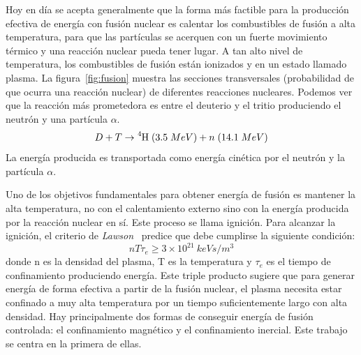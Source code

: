 Hoy en día se acepta generalmente que la forma más factible para la producción efectiva de energía 
con fusión nuclear es calentar los combustibles de fusión a alta temperatura, para que las partículas se acerquen
con un fuerte movimiento térmico y una reacción nuclear pueda tener lugar. A tan alto nivel de
temperatura, los combustibles de fusión están ionizados y en un estado llamado plasma. La figura~\ref{fig:fusion} muestra las
secciones transversales (probabilidad de que ocurra una reacción nuclear) de diferentes reacciones nucleares.
Podemos ver que la reacción más prometedora es entre el deuterio y el tritio produciendo el neutrón
y una partícula $\alpha$.
\begin{equation}\label{eq:deutreaction}
    D+T\rightarrow\ce{^{4}H}\;(3.5\;MeV)+n\;(14.1\;MeV)
\end{equation}
La energía producida es transportada como energía cinética por el neutrón y la partícula $\alpha$.\par
Uno de los objetivos fundamentales para obtener energía de fusión es mantener la alta temperatura, no con el calentamiento 
externo sino con la energía producida por la reacción nuclear en sí. Este
proceso se llama ignición. Para alcanzar la ignición, el criterio de \textit{Lawson}~\cite{Lawson_1957} predice que 
debe cumplirse la siguiente condición:
\begin{equation}\label{eq:lawson}
    nT\tau_e\geq3\times10^{21}\:keVs/m^{3}
\end{equation}
donde n es la densidad del plasma, T es la temperatura y $\tau_e$ es el tiempo de confinamiento produciendo energía.
Este triple producto sugiere que para generar energía de forma efectiva a partir de la fusión nuclear, el plasma
necesita estar confinado a muy alta temperatura por un tiempo suficientemente largo con alta densidad.
Hay principalmente dos formas de conseguir energía de fusión controlada: el confinamiento magnético 
y el confinamiento inercial. Este trabajo se centra en la primera de ellas.\par

